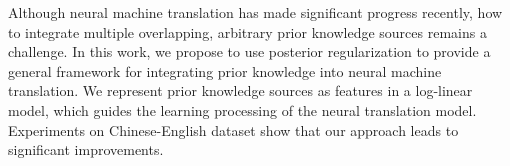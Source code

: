 Although neural machine translation has made significant progress recently, how to integrate multiple overlapping, arbitrary prior knowledge sources remains a challenge. In this work, we propose to use posterior regularization to provide a general framework for integrating prior knowledge into neural machine translation. We represent prior knowledge sources as features in a log-linear model, which guides the learning processing of the neural translation model. Experiments on Chinese-English dataset show that our approach leads to significant improvements.
